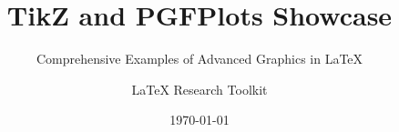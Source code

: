 \documentclass{beamer}
\title{TikZ and PGFPlots Showcase}
\subtitle{Comprehensive Examples of Advanced Graphics in LaTeX}
\author{LaTeX Research Toolkit}
\date{\today}
\begin{document}
\frame{\titlepage}









































\end{document}
